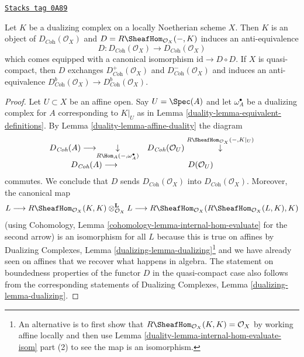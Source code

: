 \begin{lemma}
\label{duality-lemma-dualizing-schemes}
\href{https://stacks.math.columbia.edu/tag/0A89}{\texttt{Stacks tag 0A89}}

Let $K$ be a dualizing complex on a locally Noetherian scheme $X$.
Then $K$ is an object of $D_{\textit{Coh}}(\mathcal{O}_X)$
and $D = R\SheafHom_{\mathcal{O}_X}(-, K)$ induces an anti-equivalence
$$
D :
D_{\textit{Coh}}(\mathcal{O}_X)
\longrightarrow
D_{\textit{Coh}}(\mathcal{O}_X)
$$
which comes equipped with a canonical isomorphism
$\text{id} \to D \circ D$. If $X$ is quasi-compact, then
$D$ exchanges $D^+_{\textit{Coh}}(\mathcal{O}_X)$ and
$D^-_{\textit{Coh}}(\mathcal{O}_X)$ and induces an anti-equivalence
$D^b_{\textit{Coh}}(\mathcal{O}_X) \to D^b_{\textit{Coh}}(\mathcal{O}_X)$.
\end{lemma}

\begin{proof}

Let $U \subset X$ be an affine open. Say $U = \Spec(A)$ and
let $\omega_A^\bullet$ be a dualizing complex for $A$
corresponding to $K|_U$
as in Lemma \ref{duality-lemma-equivalent-definitions}.
By Lemma \ref{duality-lemma-affine-duality} the diagram
$$
\begin{array}{cc}D_{\textit{Coh}}(A) \longrightarrow\underset{R\Hom_A(-, \omega_A^\bullet)}{\downarrow} & D_{\textit{Coh}}(\mathcal{O}_U) \overset{R\SheafHom_{\mathcal{O}_X}(-, K|_U)}{\downarrow} \\ D_{\textit{Coh}}(A) \longrightarrow & D(\mathcal{O}_U)\end{array}
$$
commutes. We conclude that $D$ sends $D_{\textit{Coh}}(\mathcal{O}_X)$ into
$D_{\textit{Coh}}(\mathcal{O}_X)$. Moreover, the canonical map
$$
L
\longrightarrow
R\SheafHom_{\mathcal{O}_X}(K, K) \otimes_{\mathcal{O}_X}^\mathbf{L} L
\longrightarrow
R\SheafHom_{\mathcal{O}_X}(R\SheafHom_{\mathcal{O}_X}(L, K), K)
$$
(using Cohomology, Lemma \ref{cohomology-lemma-internal-hom-evaluate}
for the second arrow)
is an isomorphism for all $L$ because this is true on affines by
Dualizing Complexes, Lemma \ref{dualizing-lemma-dualizing}\footnote{An
alternative is to first show that
$R\SheafHom_{\mathcal{O}_X}(K, K) = \mathcal{O}_X$ by
working affine locally and then use
Lemma \ref{duality-lemma-internal-hom-evaluate-isom} part (2)
to see the map is an isomorphism.}
and we have already seen on affines that we recover what
happens in algebra.
The statement on boundedness properties of the functor $D$
in the quasi-compact case also follows from the corresponding
statements of Dualizing Complexes, Lemma \ref{dualizing-lemma-dualizing}.
\end{proof}


